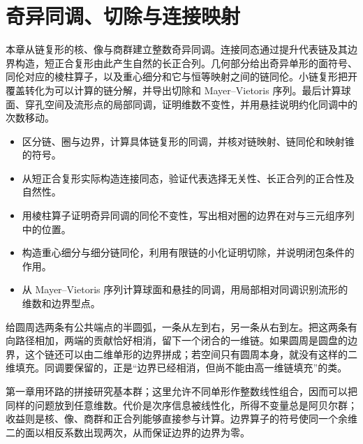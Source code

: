 
% 
% 

\chapter{奇异同调、切除与连接映射}
\label{g2:ch:02}

\begin{chapterabstract}
	本章从链复形的核、像与商群建立整数奇异同调。连接同态通过提升代表链及其边界构造，短正合复形由此产生自然的长正合列。几何部分给出奇异单形的面符号、同伦对应的棱柱算子，以及重心细分和它与恒等映射之间的链同伦。小链复形把开覆盖转化为可以计算的链分解，并导出切除和 Mayer–Vietoris 序列。最后计算球面、穿孔空间及流形点的局部同调，证明维数不变性，并用悬挂说明约化同调中的次数移动。
\end{chapterabstract}

\begin{learninggoals}
	\begin{itemize}
		\item 区分链、圈与边界，计算具体链复形的同调，并核对链映射、链同伦和映射锥的符号。
		\item 从短正合复形实际构造连接同态，验证代表选择无关性、长正合列的正合性及自然性。
		\item 用棱柱算子证明奇异同调的同伦不变性，写出相对圈的边界在对与三元组序列中的位置。
		\item 构造重心细分与细分链同伦，利用有限链的小化证明切除，并说明闭包条件的作用。
		\item 从 Mayer–Vietoris 序列计算球面和悬挂的同调，用局部相对同调识别流形的维数和边界型点。
	\end{itemize}
\end{learninggoals}

给圆周选两条有公共端点的半圆弧，一条从左到右，另一条从右到左。把这两条有向路径相加，两端的贡献恰好相消，留下一个闭合的一维链。如果圆周是圆盘的边界，这个链还可以由二维单形的边界拼成；若空间只有圆周本身，就没有这样的二维填充。同调要保留的，正是“边界已经相消，但尚不能由高一维链填充”的类。

\ProseParagraphBreak

第一章用环路的拼接研究基本群；这里允许不同单形作整数线性组合，因而可以把同样的问题放到任意维数。代价是次序信息被线性化，所得不变量总是阿贝尔群；收益则是核、像、商群和正合列能够直接参与计算。边界算子的符号使同一个余维二的面以相反系数出现两次，从而保证边界的边界为零。

